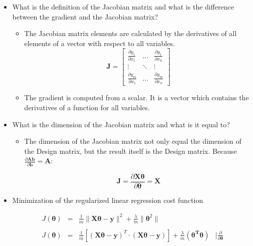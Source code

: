 \documentclass{article}
\begin{document}
\begin{itemize}
    \item What is the definition of the Jacobian matrix and what is the difference between the gradient and the Jacobian matrix?
    
    \begin{itemize}
        \item The Jacobian matrix elements are calculated by the derivatives of all elements of a vector with respect to all variables.  \\
            $$ \boldsymbol{J} = 
            \begin{bmatrix}
            	\frac{\partial y_1}{\partial x_1}	&	\dots	&	\frac{\partial y_1}{\partial x_n} 	\\
            	\vdots								&	\ddots	&	\vdots								\\
            	\frac{\partial y_m}{\partial x_1	}	&	\dots	&	\frac{\partial y_m}{\partial x_n}
            \end{bmatrix} $$
            
        \item The gradient is computed from a scalar. It is a vector which contains the derivatives of a function for all variables.              
    \end{itemize}
    
    \item What is the dimension of the Jacobian matrix and what is it equal to?
    
    \begin{itemize}
    
        \item The dimension of the Jacobian matrix not only equal the dimension of the Design matrix, but the result itself is the Design matrix. Because $\frac{\partial\boldsymbol{Ab}}{\partial\boldsymbol{b}}=\boldsymbol{A}$:
        
        $$ \boldsymbol{J} = \frac{\partial \boldsymbol{X\theta}}{\partial\boldsymbol{\theta}} = \boldsymbol{X}
$$    
    \end{itemize}
    
    \item Minimization of the regularized linear regression cost function
    
    $$\begin{array}{rclr}
        J(\boldsymbol{\theta}) & = & \frac{1}{m} \| \boldsymbol{X\theta - y} \|^2 + \frac{\lambda}{m} \| \boldsymbol{\theta}^2 \| & \\\\
        J(\boldsymbol{\theta}) & = & \frac{1}{m} \left[(\boldsymbol{X\theta - y})^T \cdot (\boldsymbol{X\theta - y}) \right] + \frac{\lambda}{m} (\boldsymbol{\theta^T \theta}) & \mid \frac{\partial}{\partial\boldsymbol{\theta}} \\
      \end{array}$$
    

\end{itemize}
\end{document}
